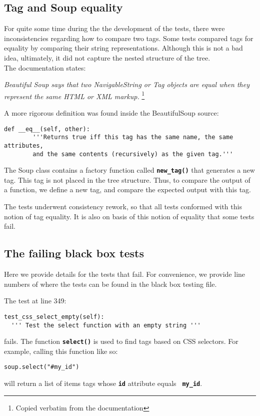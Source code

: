 \documentclass[10pt]{article}
\newcommand{\tbt}[1]{\texttt{\textbf{#1}}}
\begin{document}
\subsection{Tag and Soup equality}

For quite some time during the the development of the tests, there were inconsistencies regarding how to compare two tags. Some tests compared tags for equality by comparing their string representations. Although this is not a bad idea, ultimately, it did not capture the nested structure of the tree. \\

The documentation states: 
\begin{center}
  \textit{Beautiful Soup says that two NavigableString or Tag objects are equal when they represent the same HTML or XML markup.} \footnote{Copied verbatim from the documentation}
\end{center}

A more rigorous definition was found inside the BeautifulSoup source:
\begin{lstlisting}[style = pythonstyle]
  def __eq__(self, other):
        '''Returns true iff this tag has the same name, the same attributes,
        and the same contents (recursively) as the given tag.'''
\end{lstlisting}

The Soup class contains a factory function called \tbt{new\_tag()} that generates a new tag. This tag is not placed in the tree structure. Thus, to compare the output of a function, we define a new tag, and compare the expected output with this tag.

The tests underwent consistency rework, so that all tests conformed with this notion of tag equality. It is also on basis of this notion of equality that some tests fail. 

\subsection{The failing black box tests}

Here we provide details for the tests that fail. For convenience, we provide line numbers of where the tests can be found in the black box testing file. \\

\noindent\begin{minipage}{\textwidth}
\indent{\hspace{12pt}} The test at line 349:
\begin{lstlisting}[style = pythonstyle]
test_css_select_empty(self):
  ''' Test the select function with an empty string '''
\end{lstlisting}
\end{minipage}
fails. The function \tbt{select()} is used to find tags based on CSS selectors. For example, calling this function like so:
\begin{lstlisting}[style = pythonstyle]
soup.select("#my_id")
\end{lstlisting}
will return a list of items tags whose \tbt{id} attribute equals \tbt{\color{dark-green} my\_id}.  \\
\end{document}
